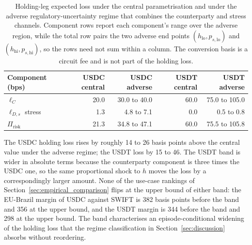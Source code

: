 \begin{table}[H]
\centering
\caption{Holding-leg expected loss under the central parametrisation and under the adverse regulatory-uncertainty regime that combines the counterparty and stress channels. Component rows report each component's range over the adverse region, while the total row pairs the two adverse end points $(h_{\text{lo}}, p_{s,\text{lo}})$ and $(h_{\text{hi}}, p_{s,\text{hi}})$, so the rows need not sum within a column. The conversion basis is a circuit fee and is not part of the holding loss.}\label{tab:reg_uncertainty_band}
\begin{tabular}{lrrrr}
\toprule
Component (bps)             & USDC central & USDC adverse & USDT central & USDT adverse \\
\midrule
$\ell_C$                    & 20.0  & 30.0 to 40.0  & 60.0  & 75.0 to 105.0 \\
$\ell_{D,s}$ stress         & \phantom{0}1.3 & \phantom{0}4.8 to 7.1 & \phantom{0}0.0 & 0.5 to 0.8 \\
\midrule
$\Pi_{\text{risk}}$         & 21.3  & 34.8 to 47.1  & 60.0  & 75.5 to 105.8 \\
\bottomrule
\end{tabular}
\end{table}

The USDC holding loss rises by roughly 14 to 26 basis points above the central value under the adverse regime; the USDT loss by 15 to 46. The USDT band is wider in absolute terms because the counterparty component is three times the USDC one, so the same proportional shock to $h$ moves the loss by a correspondingly larger amount. None of the use-case rankings of Section~\ref{sec:empirical_comparison} flips at the upper bound of either band: the EU-Brazil margin of USDC against SWIFT is 382 basis points before the band and 356 at the upper bound, and the USDT margin is 344 before the band and 298 at the upper bound. The band characterises an episode-conditional widening of the holding loss that the regime classification in Section~\ref{sec:discussion} absorbs without reordering.

